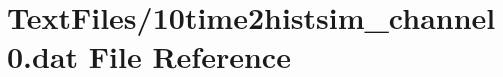 \hypertarget{10time2histsim__channel0_8dat}{}\section{Text\+Files/10time2histsim\+\_\+channel0.dat File Reference}
\label{10time2histsim__channel0_8dat}
